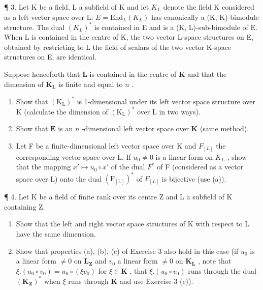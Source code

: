 ¶ 3. Let K be a field, L a subfield of K and let \(K_{L}\) denote the field K considered as a left vector space over L; \(E = \text{End}_{L}(K_{L})\) has canonically a (K, K)-bimodule structure. The dual \((K_{L})^{*}\) is contained in E and is a (K, L)-sub-bimodule of E. When L is contained in the centre of K, the two vector L-space structures on E, obtained by restricting to L the field of scalars of the two vector K-space structures on E, are identical.

Suppose henceforth that \(\mathbf{L}\) is contained in the centre of \(\mathbf{K}\) and that the dimension of \(\mathbf{K}_{\mathbf{L}}\) is finite and equal to \(n\) .

\begin{enumerate}
\def\labelenumi{(\alph{enumi})}
\item
  Show that \((\mathrm{K}_{\mathrm{L}})^{*}\) is 1-dimensional under its left vector space structure over K (calculate the dimension of \((\mathrm{K}_{\mathrm{L}})^{*}\) over L in two ways).
\item
  Show that \(\mathbf{E}\) is an \(n\) -dimensional left vector space over \(\mathbf{K}\) (same method).
\item
  Let F be a finite-dimensional left vector space over K and \(F_{[L]}\) the corresponding vector space over L. If \(u_{0} \neq 0\) is a linear form on \(K_{L}\) , show that the mapping \(x' \mapsto u_{0} \circ x'\) of the dual \(F^{*}\) of F (considered as a vector space over L) onto the dual \((\mathrm{F}_{[\mathrm{L}]})^{*}\) of \(F_{[L]}\) is bijective (use (a)).
\end{enumerate}

¶ 4. Let K be a field of finite rank over its centre Z and L a subfield of K containing Z.

\begin{enumerate}
\def\labelenumi{(\alph{enumi})}
\item
  Show that the left and right vector space structures of K with respect to L have the same dimension.
\item
  Show that properties (a), (b), (c) of Exercise 3 also hold in this case (if \(u_0\) is a linear form \(\neq 0\) on \(\mathbf{L}_{\mathbf{Z}}\) and \(v_0\) a linear form \(\neq 0\) on \(\mathbf{K}_{\mathbf{L}}\) , note that \(\xi. (u_0 \circ v_0) = u_0 \circ (\xi v_0)\) for \(\xi \in \mathbf{K}\) , that \(\xi. (u_0 \circ v_0)\) runs through the dual \((\mathbf{K}_{\mathbf{Z}})^*\) when \(\xi\) runs through \(\mathbf{K}\) and use Exercise 3 (c)).
\end{enumerate}

